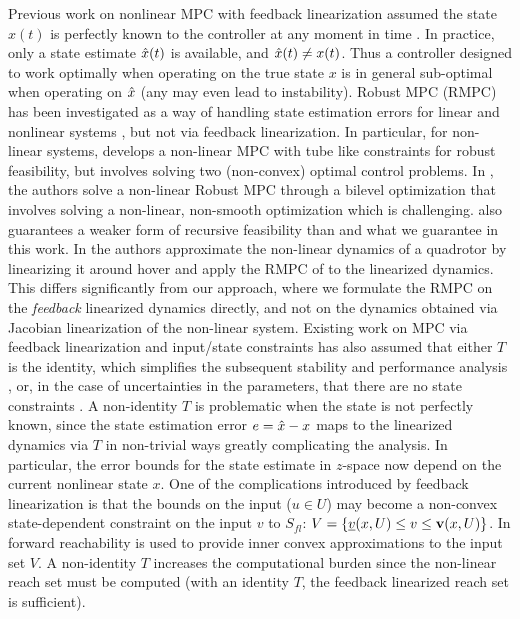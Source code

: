 Previous work on nonlinear MPC with feedback linearization assumed the state $x(t)$ is perfectly known to the controller at any moment in time \cite{SimonLG13_MPC}.
In practice, only a state estimate $\hat{x}(t)$ is available, and $\hat{x}(t) \neq x(t)$.
Thus a controller designed to work optimally when operating on the true state $x$ is in general sub-optimal when operating on $\hat{x}$ (any may even lead to instability).
Robust MPC (RMPC) has been investigated as a way of handling state estimation errors for linear \cite{RichardsH05_RMPC} and nonlinear systems \cite{tube,relaxed}, but not via feedback linearization. 
In particular, for non-linear systems, \cite{tube} develops a non-linear MPC with tube like constraints for robust feasibility, but involves solving two (non-convex) optimal control problems. 
In \cite{relaxed}, the authors solve a non-linear Robust MPC through a bilevel optimization that involves solving a non-linear, non-smooth optimization which is challenging. 
\cite{relaxed} also guarantees a weaker form of recursive feasibility than \cite{RichardsH05_RMPC} and what we guarantee in this work. 
In \cite{Zhao20141335} the authors approximate the non-linear dynamics of a quadrotor by linearizing it around hover and apply the RMPC of \cite{RichardsH05_RMPC} to the linearized dynamics.
This differs significantly from our approach, where we formulate the RMPC on the \emph{feedback} linearized dynamics directly, and not on the dynamics obtained via Jacobian linearization of the non-linear system.
Existing work on MPC via feedback linearization and input/state constraints has also assumed that either $T$ is the identity, which simplifies the subsequent stability and performance analysis \cite{SimonLG13_MPC}, 
or, in the case of uncertainties in the parameters, that there are no state constraints \cite{parameter}.
A non-identity $T$ is problematic when the state is not perfectly known, since the state estimation error $e = \hat{x}-x$ maps to the linearized dynamics via $T$ in non-trivial ways greatly complicating the analysis.
In particular, the error bounds for the state estimate in $z$-space now depend on the current nonlinear state $x$.
One of the complications introduced by feedback linearization is that the bounds on the input ($u \in U$) may become a non-convex state-dependent constraint on the input $v$ to $S_{fl}$: 
$V = \{\underline{v}(x, U) \leq v \leq \mathbf{v}(x,U)\}$.
In \cite{SimonLG13_MPC} forward reachability is used to provide inner convex approximations to the input set $V$.
A non-identity $T$ increases the computational burden since the non-linear reach set must be computed (with an identity $T$, the feedback linearized reach set is sufficient).

